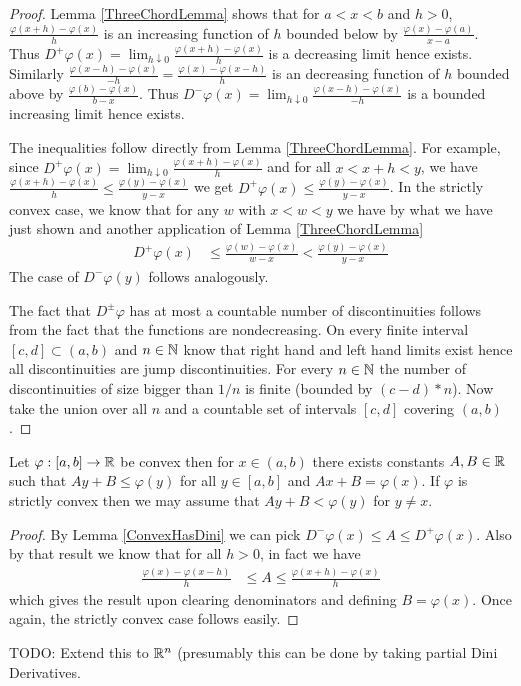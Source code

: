 \begin{proof}
Lemma \ref{ThreeChordLemma} shows that for $a < x < b$ and $h > 0$,
$\frac{\varphi(x + h) - \varphi(x)}{h}$ is an increasing function of
$h$ bounded below by $\frac{\varphi(x) - \varphi(a)}{x - a}$.  Thus $D^+\varphi(x) = \lim_{h \downarrow 0} \frac{\varphi(x + h) -
  \varphi(x)}{h}$ is a decreasing limit hence exists.
Similarly $\frac{\varphi(x - h) -
  \varphi(x)}{-h}=\frac{\varphi(x)-\varphi(x - h)}{h}$ is an decreasing
function of $h$ bounded above by $\frac{\varphi(b) - \varphi(x)}{b - x}$.  Thus $D^-\varphi(x) = \lim_{h \downarrow 0} \frac{\varphi(x - h) -
  \varphi(x)}{-h}$ is a bounded increasing limit hence
exists.  

The inequalities follow directly from Lemma \ref{ThreeChordLemma}.
For example, since $D^+\varphi(x) = \lim_{h \downarrow 0} \frac{\varphi(x + h) -
  \varphi(x)}{h}$ and for all $x < x+h < y$, we have $\frac{\varphi(x + h) -
  \varphi(x)}{h} \leq \frac{\varphi(y) -
  \varphi(x)}{y-x}$ we get $D^+\varphi(x) \leq \frac{\varphi(y) -
  \varphi(x)}{y-x}$.  In the strictly convex case, we know that for
any $w$ with
$x < w < y$ we have  by what we have just shown and
another application of Lemma \ref{ThreeChordLemma}
\begin{align*}
D^+\varphi(x) &\leq \frac{\varphi(w) -
  \varphi(x)}{w-x} < \frac{\varphi(y) -
  \varphi(x)}{y-x}
\end{align*}  The case of $D^-\varphi(y)$ follows analogously.

The fact that $D^\pm \varphi$ has at most a countable number of
discontinuities follows from the fact that the functions are nondecreasing.
On every finite interval $[c,d] \subset (a,b)$ and $n \in \mathbb{N}$ know that right
hand and left hand limits exist hence all discontinuities are jump discontinuities.  For 
every $n \in \mathbb{N}$ the number of discontinuities of size bigger than $1/n$ is finite
(bounded by $(c-d)*n$).  Now take the union over all $n$ and a countable set of intervals $[c,d]$ covering
$(a,b)$.
\end{proof}
\begin{cor}\label{ConvexHasSubderivative}Let $\varphi : [a,b] \to
  \mathbb{R}$ be convex then for $x \in (a,b)$ there exists constants $A,B
  \in \mathbb{R}$ such that $Ay + B \leq \varphi(y)$ for all $y \in [a,b]$
  and $Ax + B = \varphi(x)$.  If $\varphi$ is strictly convex then we
  may assume that $Ay + B < \varphi(y)$ for $y \neq x$.
\end{cor}
\begin{proof}
By Lemma \ref{ConvexHasDini} we can pick $D^-\varphi (x) \leq A \leq D^+\varphi (x)$.
Also by that result we know that for all $h > 0$, in fact we
have
\begin{align*}
\frac{\varphi(x) - \varphi(x-h)}{h} &\leq A \leq \frac{\varphi(x+h) - \varphi(x)}{h}
\end{align*}
which gives the result upon clearing denominators and defining $B =
\varphi(x)$.
Once again, the strictly convex case follows easily.
\end{proof}
TODO: Extend this to $\mathbb{R}^n$ (presumably this can be done by taking
partial Dini Derivatives.

